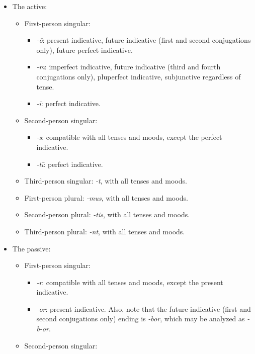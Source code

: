 \documentclass[a4paper, oneside]{report}
\newcommand{\form}[1]{\emph{#1}}
\begin{document}
\begin{itemize}
    \item The active:
    \begin{itemize}
        \item First-person singular: 
        \begin{itemize}
            \item \form{-\={o}}: present indicative, 
            future indicative (first and second conjugations only), 
            future perfect indicative.
            \item \form{-m}: imperfect indicative, 
            future indicative (third and fourth conjugations only),
            pluperfect indicative,
            subjunctive regardless of tense.
            \item \form{-ī}: perfect indicative.
        \end{itemize}
        \item Second-person singular:
        \begin{itemize}
            \item \form{-s}: compatible with all tenses and moods, except the perfect indicative.
            \item \form{-tī}: perfect indicative.
        \end{itemize}
        \item Third-person singular: \form{-t}, with all tenses and moods.
        \item First-person plural: \form{-mus}, with all tenses and moods.
        \item Second-person plural: \form{-tis}, with all tenses and moods.
        \item Third-person plural: \form{-nt}, with all tenses and moods.
    \end{itemize}
    \item The passive:
    \begin{itemize}
        \item First-person singular: 
        \begin{itemize}
            \item \form{-r}: compatible with all tenses and moods, except the present indicative.
            \item \form{-or}: present indicative.
            Also, note that the future indicative (first and second conjugations only) ending is \form{-bor},
            which may be analyzed as \form{-b-or}.
        \end{itemize}
        \item Second-person singular:

\end{itemize}
\end{itemize}
\end{document}
